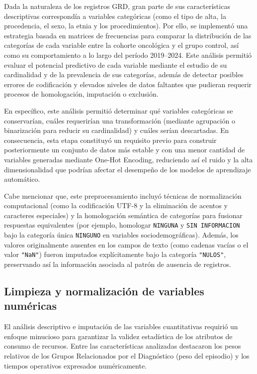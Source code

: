Dada la naturaleza de los registros GRD, gran parte de sus características descriptivas correspondía a variables categóricas (como el tipo de alta, la procedencia, el sexo, la etnia y los procedimientos). Por ello, se implementó una estrategia basada en matrices de frecuencias para comparar la distribución de las categorías de cada variable entre la cohorte oncológica y el grupo control, así como su comportamiento a lo largo del período 2019--2024. Este análisis permitió evaluar el potencial predictivo de cada variable mediante el estudio de su cardinalidad y de la prevalencia de sus categorías, además de detectar posibles errores de codificación y elevados niveles de datos faltantes que pudieran requerir procesos de homologación, imputación o exclusión.

En específico, este análisis permitió determinar qué variables categóricas se conservarían, cuáles requerirían una transformación (mediante agrupación o binarización para reducir su cardinalidad) y cuáles serían descartadas. En consecuencia, esta etapa constituyó un requisito previo para construir posteriormente un conjunto de datos más estable y con una menor cantidad de variables generadas mediante One-Hot Encoding, reduciendo así el ruido y la alta dimensionalidad que podrían afectar el desempeño de los modelos de aprendizaje automático.

Cabe mencionar que, este preprocesamiento incluyó técnicas de normalización computacional (como la codificación UTF-8 y la eliminación de acentos y caracteres especiales) y la homologación semántica de categorías para fusionar respuestas equivalentes (por ejemplo, homologar \texttt{NINGUNA} y \texttt{SIN INFORMACION} bajo la categoría única \texttt{NINGUNO} en variables sociodemográficas). Además, los valores originalmente ausentes en los campos de texto (como cadenas vacías o el valor \texttt{"NaN"}) fueron imputados explícitamente bajo la categoría \texttt{"NULOS"}, preservando así la información asociada al patrón de ausencia de registros.


\subsection{Limpieza y normalización de variables numéricas}
El análisis descriptivo e imputación de las variables cuantitativas requirió un enfoque minucioso para garantizar la validez estadística de los atributos de consumo de recursos. Entre las características analizadas destacaron los pesos relativos de los Grupos Relacionados por el Diagnóstico (peso del episodio) y los tiempos operativos expresados numéricamente.

